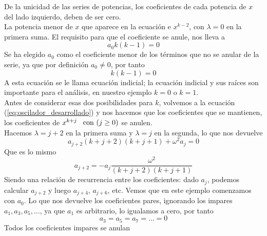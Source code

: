 De la unicidad de las series de potencias, los coeficientes de cada potencia de $x$ del lado izquierdo, deben de ser cero.
\\
La potencia menor de $x$ que aparece en la ecuación e $x^{k-2}$, con $\lambda=0$ en la primera suma. El requisito para que el coeficiente se anule, nos lleva a
\begin{equation}
a_{0} k (k-1) = 0
\end{equation}
Se ha elegido $a_{0}$ como el coeficiente menor de los términos que no se anular de la serie, ya que por definición $a_{0} \neq 0$, por tanto
\begin{equation}
k (k-1) = 0 \label{eq:ecuacion_indicial}
\end{equation}
A esta ecuación se le llama ecuación indicial; la ecuación indicial y sus raíces son importante para el análisis, en nuestro ejemplo $k=0$ o $k=1$.
\\
Antes de considerar esas dos posibilidades para $k$, volvemos a la ecuación (\ref{eq:oscilador_desarrollado}) y nos hacemos que los coeficientes que se mantienen, los coeficientes de $x^{k+j} \hspace{0.3cm} \text{con } (j \geq 0)$ se anulen.
\\
Hacemos $\lambda = j+2$ en la primera suma y $\lambda =j$ en la segunda, lo que nos devuelve
\begin{equation*}
a_{j+2} (k + j + 2) (k + j +1) + \omega^{2} a_{j} = 0
\end{equation*}
Que es lo mismo
\begin{equation}
a_{j+2} =  - a_{j} \dfrac{\omega^{2}}{(k + j +2)( k + j + 1)}
\end{equation}
Siendo una relación de recurrencia entre los coeficientes: dado $a_{j}$, podemos calcular $a_{j+2}$ y luego $a_{j+4}$, $a_{j+6}$, etc. Vemos que en este ejemplo comenzamos con $a_{0}$. Lo que nos devuelve los coeficientes pares, ignorando los  impares $a_{1}, a_{3}, a_{5}, \ldots$, ya que $a_{1}$ es arbitrario, lo igualamos a cero, por tanto
\begin{equation*}
a_{3} = a_{5} = a_{7} = \ldots = 0
\end{equation*}
Todos los coeficientes impares se anulan

